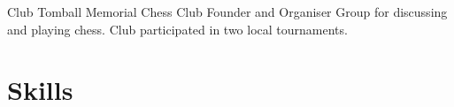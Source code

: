 \documentclass[10pt,letterpaper,sans]{moderncv}
\begin{document}
        {Club}
        {Tomball Memorial Chess Club}
        {Founder and Organiser}{}{
Group for discussing and playing chess. Club participated in two local tournaments.
}

\vspace{1em}

\section{Skills}
\end{document}
